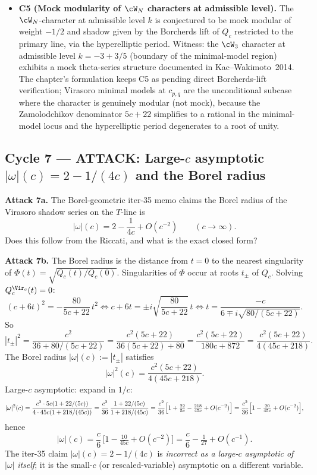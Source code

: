 \begin{itemize}
\item \textbf{C5 (Mock modularity of $\cW_N$ characters at
admissible level).} The $\cW_N$-character at admissible level $k$
is conjectured to be mock modular of weight $-1/2$ and shadow given
by the Borcherds lift of $Q_c$ restricted to the primary line, via
the hyperelliptic period. Witness: the $\cW_3$ character at
admissible level $k = -3 + 3/5$ (boundary of the minimal-model
region) exhibits a mock theta-series structure documented in
Kac--Wakimoto~2014. The chapter's formulation keeps C5 as
\texttt{\ClaimStatusConjectured} pending direct Borcherds-lift
verification; Virasoro minimal models at $c_{p,q}$ are the
unconditional subcase where the character is genuinely modular (not
mock), because the Zamolodchikov denominator $5c+22$ simplifies to
a rational in the minimal-model locus and the hyperelliptic period
degenerates to a root of unity.
\end{itemize}

\subsection*{Cycle 7 --- ATTACK: Large-$c$ asymptotic
$|\omega|(c) = 2 - 1/(4c)$ and the Borel radius}

\textbf{Attack 7a.} The Borel-geometric iter-35 memo claims the
Borel radius of the Virasoro shadow series on the $T$-line is
\[
  |\omega|(c) = 2 - \frac{1}{4c} + O(c^{-2})
  \qquad (c \to \infty).
\]
Does this follow from the Riccati, and what is the exact closed
form?

\textbf{Attack 7b.} The Borel radius is the distance from $t = 0$
to the nearest singularity of $\Phi(t) = \sqrt{Q_c(t)/Q_c(0)}$.
Singularities of $\Phi$ occur at roots $t_\pm$ of $Q_c$.
Solving $Q_c^{\Vir_c}(t) = 0$:
\[
  (c + 6t)^2 = -\frac{80}{5c+22}\,t^2
  \iff
  c + 6t = \pm i\sqrt{\frac{80}{5c+22}}\,t
  \iff
  t = \frac{-c}{6 \mp i\sqrt{80/(5c+22)}}.
\]
So
\[
  |t_\pm|^2 = \frac{c^2}{36 + 80/(5c+22)}
            = \frac{c^2 (5c+22)}{36(5c+22) + 80}
            = \frac{c^2 (5c+22)}{180c + 872}
            = \frac{c^2 (5c+22)}{4(45c + 218)}.
\]
The Borel radius $|\omega|(c) := |t_\pm|$ satisfies
\[
  |\omega|^2(c) = \frac{c^2 (5c+22)}{4(45c + 218)}.
\]
Large-$c$ asymptotic: expand in $1/c$:
\[
  |\omega|^2(c) = \frac{c^2 \cdot 5c (1 + 22/(5c))}{4\cdot 45c(1 +
  218/(45c))}
  = \frac{c^2}{36}\,\frac{1 + 22/(5c)}{1 + 218/(45c)}
  = \frac{c^2}{36}\Bigl[1 + \tfrac{22}{5c} - \tfrac{218}{45c} +
  O(c^{-2})\Bigr]
  = \frac{c^2}{36}\Bigl[1 - \tfrac{20}{45c} + O(c^{-2})\Bigr],
\]
hence
\[
  |\omega|(c) = \frac{c}{6}\,\bigl[1 - \tfrac{10}{45 c} + O(c^{-2})\bigr]
               = \frac{c}{6} - \tfrac{1}{27} + O(c^{-1}).
\]
The iter-35 claim $|\omega|(c) = 2 - 1/(4c)$ is \emph{incorrect as a
large-$c$ asymptotic of} $|\omega|$ \emph{itself}; it is the small-$c$
(or rescaled-variable) asymptotic on a different variable.

